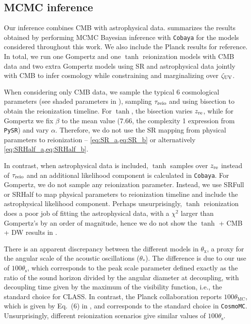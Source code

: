 \subsection*{MCMC inference}
\label{ssec:fits}

Our inference combines CMB with astrophysical data.
 summarizes the results obtained by performing MCMC
Bayesian inference with \texttt{Cobaya} for the models considered
throughout this work.
We also include the Planck results \cite{Planck2020a} for reference.
In total, we run one Gompertz and one $\tanh$ reionization models with
CMB data and two extra Gompertz models using SR and astrophysical data
jointly with CMB to infer cosmology while constraining and
marginalizing over $\zeta_\mathrm{UV}$.

When considering only CMB data, we sample the typical 6 cosmological
parameters (see shaded parameters in ), sampling
$\tau_{\mathrm{reio}}$ and using bisection to obtain the reionization timeline.
For $\tanh$, the bisection varies $z_{\mathrm{re}}$, while for Gompertz we fix
$\beta$ to the mean value (7.66, the complexity 1 expression from
\texttt{PySR}) and vary $\alpha$.
Therefore, we do not use the SR mapping from physical parameters to
reionization -- \cref{eq:SR_a,eq:SR_b} or alternatively
\cref{eq:SRHalf_a,eq:SRHalf_b}.

In contrast, when astrophysical data is included, $\tanh$ samples over
$z_{\mathrm{re}}$ instead of $\tau_{\mathrm{reio}}$ and an additional likelihood component
is calculated in \texttt{Cobaya}.
For Gompertz, we do not sample any reionization parameter.
Instead, we use SRFull or SRHalf to map physical parameters to
reionization timeline and include the astrophysical likelihood
component.
Perhaps unsurprisingly, $\tanh$ reionization does a poor job of fitting
the astrophysical data, with a $\chi^2$ larger than Gompertz's by an
order of magnitude, hence we do not show the $\tanh$ + CMB + DW results
in .

There is an apparent discrepancy between the different models in
$\theta_\mathrm{x}$, a proxy for the angular scale of the acoustic
oscillations ($\theta_*$).
The difference is due to our use of $100\theta_\mathrm{s}$, which
corresponds to the peak scale parameter defined exactly as the ratio of
the sound horizon divided by the angular diameter at decoupling, with
decoupling time given by the maximum of the visibility function, i.e.,
the standard choice for CLASS.
In contrast, the Planck collaboration reports $100\theta_\mathrm{MC}$,
which is given by Eq.~(6) in \cite{Planck2014}, and corresponds to the
standard choice in \texttt{CosmoMC}\cite{Lewis2002}.
Unsurprisingly, different reionization scenarios give similar values of
$100\theta_\mathrm{s}$.

